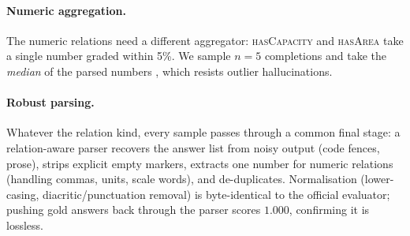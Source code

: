 \paragraph{Numeric aggregation.}
The numeric relations need a different aggregator: \textsc{hasCapacity} and
\textsc{hasArea} take a single number graded within 5\%. We sample $n{=}5$
completions and take the \emph{median} of the parsed numbers
\citep{wang2022selfconsistency}, which resists outlier hallucinations.

\paragraph{Robust parsing.}
Whatever the relation kind, every sample passes through a common final stage: a
relation-aware parser recovers the answer list from noisy output (code fences,
prose), strips explicit empty markers, extracts one number for numeric relations
(handling commas, units, scale words), and de-duplicates. Normalisation
(lower-casing, diacritic/punctuation removal) is byte-identical to the official
evaluator; pushing gold answers back through the parser scores $1.000$, confirming
it is lossless.
